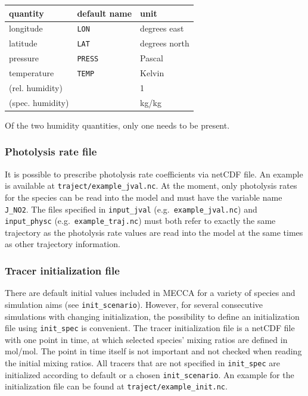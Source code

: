 \documentclass[twoside]{article}
\begin{document}
\begin{center}
  \begin{tabular}{lll}
    \hline
    quantity       & default name &  unit\\
    \hline
    longitude      & \verb|LON|   &  degrees east\\
    latitude       & \verb|LAT|   &  degrees north\\
    pressure       & \verb|PRESS| &  Pascal\\
    temperature    & \verb|TEMP|  &  Kelvin\\
    (rel. humidity)  &            &  1\\
    (spec. humidity) &            &  kg/kg\\
    \hline
  \end{tabular}
\end{center}

Of the two humidity quantities, only one needs to be present.

\subsubsection{Photolysis rate file}
\label{sec:jvalfile}

It is possible to prescribe photolysis rate coefficients via netCDF
file. An example is available at \verb|traject/example_jval.nc|. At the
moment, only photolysis rates for the species  can be read
into the model and must have the variable name \verb|J_NO2|. The files
specified in \verb|input_jval| (e.g.\ \verb|example_jval.nc|) and
\verb|input_physc| (e.g.\ \verb|example_traj.nc|) must both refer to
exactly the same trajectory as the photolysis rate values are read into
the model at the same times as other trajectory information.

\subsubsection{Tracer initialization file}
\label{sec:tracfile}

There are default initial values included in MECCA for a variety of
species and simulation aims (see \verb|init_scenario|). However, for
several consecutive simulations with changing initialization, the
possibility to define an initialization file using \verb|init_spec| is
convenient. The tracer initialization file is a netCDF file with one
point in time, at which selected species' mixing ratios are defined in
mol/mol. The point in time itself is not important and not checked when
reading the initial mixing ratios. All tracers that are not specified in
\verb|init_spec| are initialized according to default or a chosen
\verb|init_scenario|. An example for the initialization file can be
found at \verb|traject/example_init.nc|.
\end{document}
